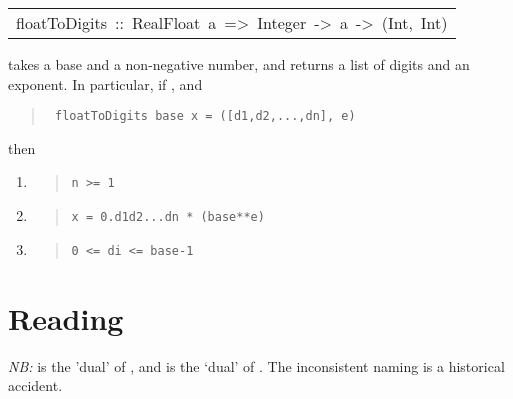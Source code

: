 \begin{haddockdesc}
\item[\begin{tabular}{@{}l}
floatToDigits\ ::\ RealFloat\ a\ =>\ Integer\ ->\ a\ ->\ ({\char 91}Int{\char 93},\ Int)
\end{tabular}]\haddockbegindoc
{} takes a base and a non-negative  number,
 and returns a list of digits and an exponent. 
 In particular, if , and
\par
\begin{quote}
{\haddockverb\begin{verbatim}
 floatToDigits base x = ([d1,d2,...,dn], e)
\end{verbatim}}
\end{quote}
then
\par
\begin{enumerate}
\item 
\begin{quote}
{\haddockverb\begin{verbatim}
n >= 1\end{verbatim}}
\end{quote}

\item 
\begin{quote}
{\haddockverb\begin{verbatim}
x = 0.d1d2...dn * (base**e)\end{verbatim}}
\end{quote}

\item 
\begin{quote}
{\haddockverb\begin{verbatim}
0 <= di <= base-1\end{verbatim}}
\end{quote}

\end{enumerate}

\end{haddockdesc}
\section{Reading
}
\emph{NB:}  is the 'dual' of ,
 and  is the `dual' of .
 The inconsistent naming is a historical accident.
\par

